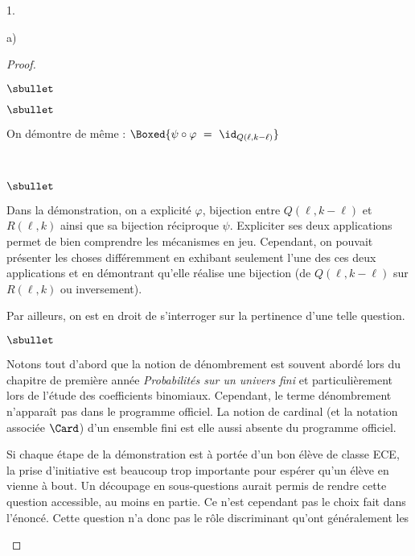 \documentclass[11pt]{article}%
\begin{document}
\begin{noliste}{1.}
\begin{noliste}{a)}
\begin{proof}
\begin{noliste}{$\sbullet$}
\begin{noliste}{$\sbullet$}
        \item On démontre de même : $\Boxed{\psi \circ \varphi \ = \
          \id_{Q(\ell, k-\ell)}}$\\[-.6cm]
        \end{noliste}        
      \end{noliste}  
      ~\\[-.8cm]
      \begin{remarkL}{.98}%
        \begin{noliste}{$\sbullet$}
        \item Dans la démonstration, on a explicité $\varphi$,
          bijection entre $Q(\ell, k - \ell)$ et $R(\ell, k)$ ainsi
          que sa bijection réciproque $\psi$. Expliciter ses deux
          applications permet de bien comprendre les mécanismes en
          jeu. Cependant, on pouvait présenter les choses différemment
          en exhibant seulement l'une des ces deux applications et en
          démontrant qu'elle réalise une bijection (de $Q(\ell, k -
          \ell)$ sur $R(\ell, k)$ ou inversement).
        \end{noliste}
        Par ailleurs, on est en droit de s'interroger sur la
        pertinence d'une telle question.
        \begin{noliste}{$\sbullet$}
        \item Notons tout d'abord que la notion de dénombrement est
          souvent abordé lors du chapitre de première année {\it
            Probabilités sur un univers fini} et particulièrement lors
          de l'étude des coefficients binomiaux. Cependant, le terme
          \og dénombrement \fg{} n'apparaît pas dans le programme
          officiel. La notion de cardinal (et la notation associée
          $\Card$) d'un ensemble fini est elle aussi absente du
          programme officiel.
        \item Si chaque étape de la démonstration est à portée d'un
          bon élève de classe ECE, la prise d'initiative est beaucoup
          trop importante pour espérer qu'un élève en vienne à
          bout. Un découpage en sous-questions aurait permis de rendre
          cette question accessible, au moins en partie. Ce n'est
          cependant pas le choix fait dans l'énoncé. Cette question
          n'a donc pas le rôle discriminant qu'ont généralement les

\end{noliste}
\end{remarkL}
\end{proof}
\end{noliste}
\end{noliste}
\end{document}

